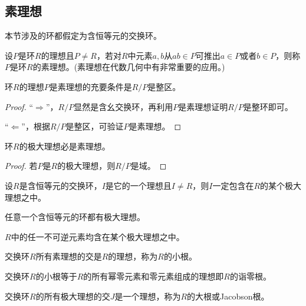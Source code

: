 \subsection{素理想}

本节涉及的环都假定为含恒等元的交换环。

\begin{definition}
	设$P$是环$R$的理想且$P\neq R$，若对$R$中元素$a,b$从$ab\in P$可推出$a\in P$或者$b\in P$，则称$P$是环$R$的素理想。(素理想在代数几何中有非常重要的应用。)
\end{definition}

\begin{theorem}
	环$R$的理想$P$是素理想的充要条件是$R/P$是整区。	
\end{theorem}
\begin{proof}
	“$\Rightarrow$”，$R/P$显然是含幺交换环，再利用$P$是素理想证明$R/P$是整环即可。
	\par
	“$\Leftarrow$”，根据$R/P$是整区，可验证$P$是素理想。
\end{proof}

\begin{corollary}
	环$R$的极大理想必是素理想。
\end{corollary}
\begin{proof}
	若$P$是$R$的极大理想，则$R/P$是域。
\end{proof}

\begin{theorem}
	设$R$是含恒等元的交换环，$I$是它的一个理想且$I\neq R$，则$I$一定包含在$R$的某个极大理想之中。
\end{theorem}

\begin{corollary}
	任意一个含恒等元的环都有极大理想。
\end{corollary}

\begin{corollary}
	$R$中的任一不可逆元素均含在某个极大理想之中。
\end{corollary}

\begin{definition}
	交换环$R$所有素理想的交是$R$的理想，称为$R$的小根。
\end{definition}

\begin{theorem}
	交换环$R$的小根等于$R$的所有幂零元素和零元素组成的理想即$R$的诣零根。
\end{theorem}

\begin{definition}
	交换环$R$的所有极大理想的交$J$是一个理想，称为$R$的大根或Jacobson根。
\end{definition}

